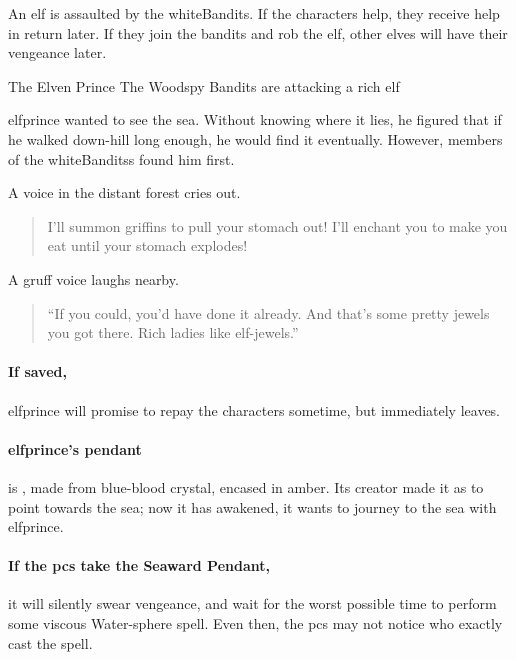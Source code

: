 \label{littleprince}

\noindent
An elf is assaulted by the \gls{whiteBandits}.
If the characters help, they receive help in return later.
If they join the bandits and rob the elf, other elves will have their vengeance later.

{The Elven Prince}%
{The Woodspy Bandits are attacking a rich elf}%

\Gls{elfprince} wanted to see the sea.
Without knowing where it lies, he figured that if he walked down-hill long enough, he would find it eventually.
However, members of the \glspl{whiteBandits} found him first.

\begin{boxtext}
  A voice in the distant forest cries out.
  \begin{quote}
    I'll summon griffins to pull your stomach out!  I'll enchant you to make you eat until your stomach explodes!
  \end{quote}

  A gruff voice laughs nearby.

  \begin{quote}
    ``If you could, you'd have done it already.  And that's some pretty jewels you got there.  Rich ladies like elf-jewels.''
  \end{quote}

\end{boxtext}


\elfprince

\showStdSpells

\paragraph{If saved,}
\gls{elfprince} will promise to repay the characters sometime, but immediately leaves.

\paragraph{\Gls{elfprince}'s pendant}
is , made from blue-blood crystal, encased in amber.
Its creator made it as  to point towards the sea; now it has awakened, it wants to journey to the sea with \gls{elfprince}.

\paragraph{If the \glspl{pc} take the Seaward Pendant,}
it will silently swear vengeance, and wait for the worst possible time to perform some viscous Water-\gls{sphere} \gls{spell}.
Even then, the \glspl{pc} may not notice who exactly cast the spell.

